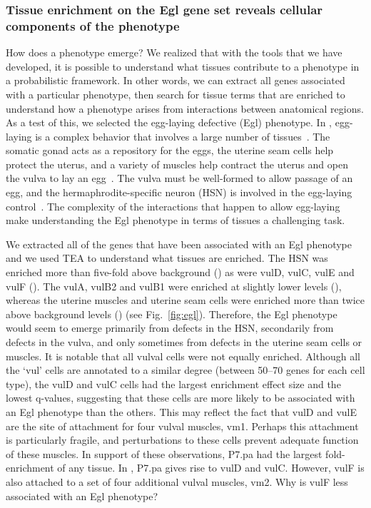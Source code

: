 \subsubsection*{Tissue enrichment on the Egl gene set reveals cellular
components of the phenotype}
How does a phenotype emerge? We realized that with the tools that we have
developed, it is possible to understand what tissues contribute to a phenotype
in a probabilistic framework. In other words, we can extract all genes associated
with a particular phenotype, then search for tissue terms that are enriched to
understand how a phenotype arises from interactions between anatomical regions.
As a test of this, we selected the egg-laying defective (Egl) phenotype.
In \cel{}, egg-laying is a complex behavior that involves
a large number of tissues~\citep{Li1990}. The somatic gonad acts as a
repository for the eggs,
the uterine seam cells help protect the uterus, and a variety of muscles help
contract the uterus and open the vulva to lay an egg~\citep{Sulston1977}. The
vulva must be well-formed
to allow passage of an egg, and the hermaphrodite-specific neuron (HSN) is involved
in the egg-laying control~\citep{Schafer2005}. The complexity of the interactions that
happen to allow egg-laying make understanding the Egl phenotype in terms of
tissues a challenging task.

We extracted all of the \cel{} genes that have been associated with an Egl
phenotype and we used TEA to understand what tissues are enriched. The HSN
was enriched more than five-fold above background () as were vulD, vulC,
vulE and vulF (). The vulA, vulB2 and vulB1 were
enriched at slightly lower levels (), whereas the uterine muscles and
uterine seam cells were enriched more than twice above background levels
() (see Fig.~\ref{fig:egl}).
Therefore, the Egl phenotype would seem to emerge primarily from defects in the
HSN, secondarily from defects in the vulva, and only sometimes from defects in the
uterine seam cells or muscles. It is notable that all vulval cells were not equally
enriched. Although all the `vul' cells are annotated to a similar degree (between
50--70 genes for each cell type), the vulD and vulC cells had the largest
enrichment effect size and the lowest q-values, suggesting that these cells
are more likely to be associated with an Egl phenotype than the others. This may
reflect the fact that vulD and vulE are the site of attachment for four vulval
muscles, vm1. Perhaps this attachment is particularly fragile, and perturbations
to these cells prevent adequate function of these muscles. In support of these
observations, P7.pa had the largest fold-enrichment of any tissue. In \cel{},
P7.pa gives rise to vulD and vulC. However, vulF is
also attached to a set of four additional vulval muscles, vm2. Why
is vulF less associated with an Egl phenotype?

